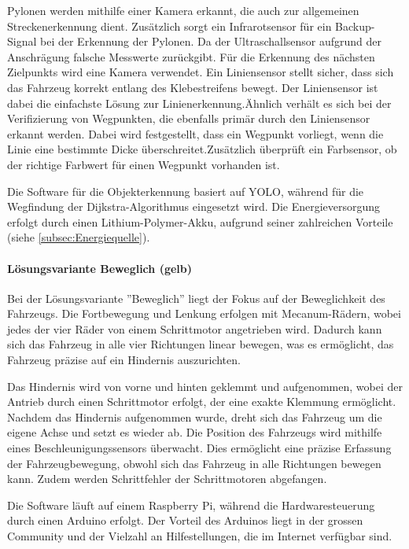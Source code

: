 \documentclass[../main.tex]{subfiles}
\begin{document}
    Pylonen werden mithilfe einer Kamera erkannt, die auch zur allgemeinen Streckenerkennung dient. Zusätzlich sorgt ein Infrarotsensor für ein Backup-Signal bei der Erkennung der Pylonen. Da der Ultraschallsensor aufgrund der Anschrägung falsche Messwerte zurückgibt. Für die Erkennung des nächsten Zielpunkts wird eine Kamera verwendet. Ein Liniensensor stellt sicher, dass sich das Fahrzeug korrekt entlang des Klebestreifens bewegt. Der Liniensensor ist dabei die einfachste Lösung zur Linienerkennung.Ähnlich verhält es sich bei der Verifizierung von Wegpunkten, die ebenfalls primär durch den Liniensensor erkannt werden. Dabei wird festgestellt, dass ein Wegpunkt vorliegt, wenn die Linie eine bestimmte Dicke überschreitet.Zusätzlich überprüft ein Farbsensor, ob der richtige Farbwert für einen Wegpunkt vorhanden ist.

    Die Software für die Objekterkennung basiert auf YOLO, während für die Wegfindung der Dijkstra-Algorithmus eingesetzt wird. Die Energieversorgung erfolgt durch einen Lithium-Polymer-Akku, aufgrund seiner zahlreichen Vorteile (siehe \ref{subsec:Energiequelle}).

    \paragraph{Lösungsvariante Beweglich (gelb)}
    Bei der Lösungsvariante ''Beweglich'' liegt der Fokus auf der Beweglichkeit des Fahrzeugs. Die Fortbewegung und Lenkung erfolgen mit Mecanum-Rädern, wobei jedes der vier Räder von einem Schrittmotor angetrieben wird. Dadurch kann sich das Fahrzeug in alle vier Richtungen linear bewegen, was es ermöglicht, das Fahrzeug präzise auf ein Hindernis auszurichten.

    Das Hindernis wird von vorne und hinten geklemmt und aufgenommen, wobei der Antrieb durch einen Schrittmotor erfolgt, der eine exakte Klemmung ermöglicht. Nachdem das Hindernis aufgenommen wurde, dreht sich das Fahrzeug um die eigene Achse und setzt es wieder ab. Die Position des Fahrzeugs wird mithilfe eines Beschleunigungssensors überwacht. Dies ermöglicht eine präzise Erfassung der Fahrzeugbewegung, obwohl sich das Fahrzeug in alle Richtungen bewegen kann. Zudem werden Schrittfehler der Schrittmotoren abgefangen.

    Die Software läuft auf einem Raspberry Pi, während die Hardwaresteuerung durch einen Arduino erfolgt. Der Vorteil des Arduinos liegt in der grossen Community und der Vielzahl an Hilfestellungen, die im Internet verfügbar sind.
\end{document}
